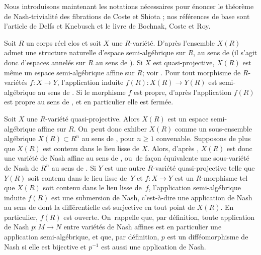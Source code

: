 Nous introduisons maintenant les notations nécessaires pour énoncer le théorème de Nash-trivialité des fibrations
de Coste et Shiota \cite{coste1992nash}; nos références de base sont l'article \cite{delfs1981semialgebraicII} de Delfs et Knebusch et le livre \cite{bochnak1998real} de Bochnak, Coste et Roy.

Soit $R$ un corps réel clos et soit $X$ une $R$-variété. D'après \cite[Ex.\,2 p.\,182]{delfs1981semialgebraicII} l'ensemble $X(R)$ admet une structure naturelle d'espace semi-algébrique sur $R$, au sens de \cite[Def.\,3 p.\,182]{delfs1981semialgebraicII} (il s'agit donc d'espaces annelés sur $R$ au sens de \cite[Def.\,2 p.\,182]{delfs1981semialgebraicII}). Si $X$ est quasi-projective, $X(R)$ est même un espace semi-algébrique affine sur $R$; voir \cite[Rem.\ p.\,182]{delfs1981semialgebraicII}. Pour tout morphisme de $R$-variétés $f\colon X\to Y$, l'application induite $f(R)\colon X(R)\to Y(R)$ est semi-algébrique au sens de \cite[p.\,184]{delfs1981semialgebraicII}. Si le morphisme $f$ est propre, d'après \cite[Th.\,9.6]{delfs1981semialgebraicII} l'application $f(R)$ est propre au sens de \cite[Def.\ p.\,192]{delfs1981semialgebraicII}, et en particulier elle est fermée.

Soit $X$ une $R$-variété quasi-projective. Alors $X(R)$ est un espace semi-algébrique affine sur $R$. On~peut donc exhiber $X(R)$ comme un sous-ensemble algébrique \hbox{$X(R)\subset R^n$} au sens de \cite[Def.\,2.1.1]{bochnak1998real}, pour $n\geq 1$ convenable. Supposons de plus que $X(R)$ est contenu dans le lieu lisse de $X$. Alors, d'après \cite[Prop.\,3.3.11]{bochnak1998real}, $X(R)$ est donc une variété de Nash affine au sens de \cite[p.\,351]{coste1992nash}, ou~de façon équivalente une sous-variété de Nash de $R^n$ au sens de \cite[Def.\,2.9.9]{bochnak1998real}. Si $Y$ est une autre $R$-variété quasi-projective telle que $Y(R)$ soit contenu dans le lieu lisse de~$Y$ et $f\colon X\to Y$ est un $R$-morphisme tel que $X(R)$ soit contenu dans le lieu lisse de~$f$, l'application semi-algébrique induite $f(R)$ est une submersion de Nash, c'est-à-dire une application de Nash au sens de \cite[Def.\,2.9.9]{bochnak1998real} dont la différentielle est surjective en tout point de $X(R)$. En particulier, $f(R)$ est ouverte. On~rappelle que, par définition, toute application de Nash $p\colon M\to N$ entre variétés de Nash affines est en particulier une application semi-algébrique, et que, par définition, $p$ est un difféomorphisme de Nash si elle est bijective et $p^{-1}$ est aussi une application de Nash.

